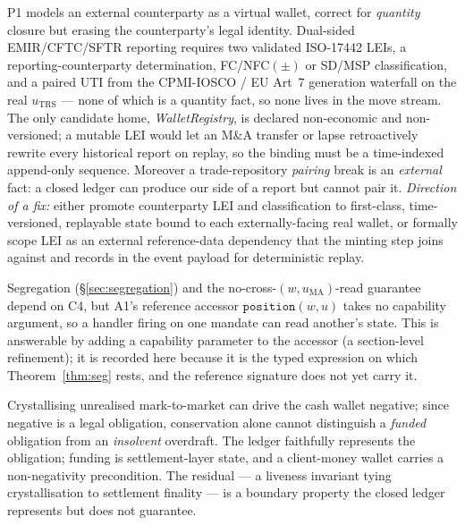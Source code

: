 \documentclass[11pt,a4paper]{article}
\begin{document}
\begin{description}[leftmargin=0pt,style=nextline]
\item[\textbf{E3 --- The closed system is blind to counterparty legal identity.}]
P1 models an external counterparty as a virtual wallet, correct for \emph{quantity} closure but
erasing the counterparty's legal identity. Dual-sided EMIR/CFTC/SFTR reporting requires two
validated ISO-17442 LEIs, a reporting-counterparty determination, FC/NFC$(\pm)$ or SD/MSP
classification, and a paired UTI from the CPMI-IOSCO / EU Art~7 generation waterfall on the real
$u_{\mathrm{TRS}}$ --- none of which is a quantity fact, so none lives in the move stream. The only
candidate home, \textit{WalletRegistry}, is declared non-economic and non-versioned; a mutable LEI
would let an M\&A transfer or lapse retroactively rewrite every historical report on replay, so the
binding must be a time-indexed append-only sequence. Moreover a trade-repository \emph{pairing}
break is an \emph{external} fact: a closed ledger can produce our side of a report but cannot pair
it. \emph{Direction of a fix:} either promote counterparty LEI and classification to first-class,
time-versioned, replayable state bound to each externally-facing real wallet, or formally scope LEI
as an external reference-data dependency that the minting step joins against and records in the
event payload for deterministic replay.

\item[\textbf{E4 --- C4 capability scoping is asserted, not typed.}]
Segregation (\S\ref{sec:segregation}) and the no-cross-$(w,u_{\mathrm{MA}})$-read guarantee depend
on C4, but A1's reference accessor $\texttt{position}(w,u)$ takes no capability argument, so a
handler firing on one mandate can read another's state. This is answerable by adding a capability
parameter to the accessor (a section-level refinement); it is recorded here because it is the typed
expression on which Theorem~\ref{thm:seg} rests, and the reference signature does not yet carry it.

\item[\textbf{E5 --- No in-ledger solvency liveness.}]
Crystallising unrealised mark-to-market can drive the cash wallet negative; since negative is a
legal obligation, conservation alone cannot distinguish a \emph{funded} obligation from an
\emph{insolvent} overdraft. The ledger faithfully represents the obligation; funding is
settlement-layer state, and a client-money wallet carries a non-negativity precondition. The
residual --- a liveness invariant tying crystallisation to settlement finality --- is a boundary
property the closed ledger represents but does not guarantee.
\end{description}
\end{document}
